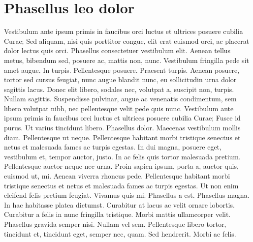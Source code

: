 \section{Phasellus leo dolor}
Vestibulum ante ipsum primis in faucibus orci luctus et ultrices posuere cubilia Curae; Sed aliquam, nisi quis porttitor congue, elit erat euismod orci, ac placerat dolor lectus quis orci. Phasellus consectetuer vestibulum elit. Aenean tellus metus, bibendum sed, posuere ac, mattis non, nunc. Vestibulum fringilla pede sit amet augue. In turpis. Pellentesque posuere. Praesent turpis. Aenean posuere, tortor sed cursus feugiat, nunc augue blandit nunc, eu sollicitudin urna dolor sagittis lacus. Donec elit libero, sodales nec, volutpat a, suscipit non, turpis. Nullam sagittis. Suspendisse pulvinar, augue ac venenatis condimentum, sem libero volutpat nibh, nec pellentesque velit pede quis nunc. Vestibulum ante ipsum primis in faucibus orci luctus et ultrices posuere cubilia Curae; Fusce id purus. Ut varius tincidunt libero. Phasellus dolor. Maecenas vestibulum mollis diam. Pellentesque ut neque. Pellentesque habitant morbi tristique senectus et netus et malesuada fames ac turpis egestas. In dui magna, posuere eget, vestibulum et, tempor auctor, justo. In ac felis quis tortor malesuada pretium. Pellentesque auctor neque nec urna. Proin sapien ipsum, porta a, auctor quis, euismod ut, mi. Aenean viverra rhoncus pede. Pellentesque habitant morbi tristique senectus et netus et malesuada fames ac turpis egestas. Ut non enim eleifend felis pretium feugiat. Vivamus quis mi. Phasellus a est. Phasellus magna. In hac habitasse platea dictumst. Curabitur at lacus ac velit ornare lobortis. Curabitur a felis in nunc fringilla tristique. Morbi mattis ullamcorper velit. Phasellus gravida semper nisi. Nullam vel sem. Pellentesque libero tortor, tincidunt et, tincidunt eget, semper nec, quam. Sed hendrerit. Morbi ac felis.


